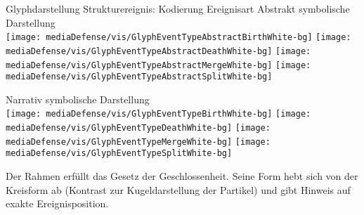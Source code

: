 \documentclass[10pt]{beamer}
\begin{document}
%
%
\begin{frame}{Glyphdarstellung Strukturereignis: Kodierung Ereignisart}
	Abstrakt symbolische Darstellung\\
					\texttt{[image: mediaDefense/vis/GlyphEventTypeAbstractBirthWhite-bg]}
					\hspace*{.06\textwidth}%
					\texttt{[image: mediaDefense/vis/GlyphEventTypeAbstractDeathWhite-bg]}
					\hspace*{.06\textwidth}%
					\texttt{[image: mediaDefense/vis/GlyphEventTypeAbstractMergeWhite-bg]}
					\hspace*{.06\textwidth}%
					\texttt{[image: mediaDefense/vis/GlyphEventTypeAbstractSplitWhite-bg]}
					
	Narrativ symbolische Darstellung\\
					\texttt{[image: mediaDefense/vis/GlyphEventTypeBirthWhite-bg]}
					\hspace*{.06\textwidth}%
					\texttt{[image: mediaDefense/vis/GlyphEventTypeDeathWhite-bg]}
					\hspace*{.06\textwidth}%
					\texttt{[image: mediaDefense/vis/GlyphEventTypeMergeWhite-bg]}
					\hspace*{.06\textwidth}%
					\texttt{[image: mediaDefense/vis/GlyphEventTypeSplitWhite-bg]}
					
	Der Rahmen erfüllt das Gesetz der Geschlossenheit. Seine Form hebt sich von der Kreisform ab (Kontrast zur Kugeldarstellung der Partikel) und gibt Hinweis auf exakte Ereignisposition.
\end{frame}
\end{document}
